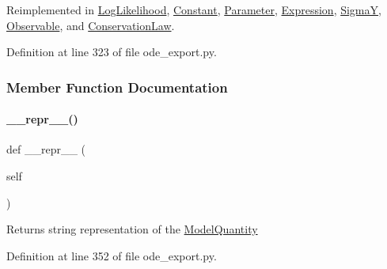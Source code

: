 Reimplemented in \mbox{\hyperlink{classamici_1_1ode__export_1_1_log_likelihood_a258843a3afab00b576ccf386e8673a64}{Log\+Likelihood}}, \mbox{\hyperlink{classamici_1_1ode__export_1_1_constant_a258843a3afab00b576ccf386e8673a64}{Constant}}, \mbox{\hyperlink{classamici_1_1ode__export_1_1_parameter_a258843a3afab00b576ccf386e8673a64}{Parameter}}, \mbox{\hyperlink{classamici_1_1ode__export_1_1_expression_a258843a3afab00b576ccf386e8673a64}{Expression}}, \mbox{\hyperlink{classamici_1_1ode__export_1_1_sigma_y_a258843a3afab00b576ccf386e8673a64}{SigmaY}}, \mbox{\hyperlink{classamici_1_1ode__export_1_1_observable_a258843a3afab00b576ccf386e8673a64}{Observable}}, and \mbox{\hyperlink{classamici_1_1ode__export_1_1_conservation_law_a258843a3afab00b576ccf386e8673a64}{Conservation\+Law}}.



Definition at line 323 of file ode\+\_\+export.\+py.



\subsubsection{Member Function Documentation}
\mbox{\label{classamici_1_1ode__export_1_1_model_quantity_a9a47563093dfc5ba12274b66e368920c}} 
\paragraph{\texorpdfstring{\_\_repr\_\_()}{\_\_repr\_\_()}}
{\footnotesize\ttfamily def \+\_\+\+\_\+repr\+\_\+\+\_\+ (\begin{DoxyParamCaption}\item[{}]{self }\end{DoxyParamCaption})}

\begin{DoxyReturn}{Returns}
string representation of the \mbox{\hyperlink{classamici_1_1ode__export_1_1_model_quantity}{Model\+Quantity}} 
\end{DoxyReturn}


Definition at line 352 of file ode\+\_\+export.\+py.

\mbox{\label{classamici_1_1ode__export_1_1_model_quantity_a52cfbb3619e7f1360e8dc7cb0e90635b}} 
